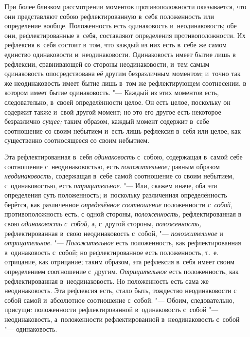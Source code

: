 При более близком рассмотрении моментов противоположности оказывается, что
они представляют собою рефлектированную в~себя положенность или определение
вообще. Положенность есть одинаковость и~неодинаковость; обе они,
рефлектированные в~себя, составляют определения противоположности. Их
рефлексия в~себя состоит в~том, что каждый из них есть в~себе же самом
единство одинаковости и~неодинаковости. Одинаковость имеет бытие лишь в
рефлексии, сравнивающей со стороны неодинаковости, и~тем самым одинаковость
опосредствована её другим безразличным моментом; и~точно так же
неодинаковость имеет бытие лишь в~том же рефлектирующем соотнесении, в
котором имеет бытие одинаковость. "--- Каждый из этих моментов есть,
следовательно, в~своей определённости целое. Он есть целое, поскольку он
содержит также и~свой другой момент; но это его другое есть некоторое
безразлично {\em сущее;} таким образом, каждый момент
содержит в~себе соотношение со своим небытием и~есть лишь рефлексия в~себя
или целое, как существенно соотносящееся со своим небытием.

Эта рефлектированная в~себя {\em одинаковость} с~собою,
содержащая в~самой себе соотношение с~неодинаковостью, есть
{\em положительное;} равным образом
{\em неодинаковость,} содержащая в~себе самой
соотношение со своим небытием, с~одинаковостью, есть
{\em отрицательное}. "--- Или, скажем иначе, оба эти
определения суть положенность; и~поскольку различенная определённость
берётся, как различенное {\em определённое соотношение}
положенности {\em с~собой,} противоположность есть, с
одной стороны, {\em положенность,} рефлектированная в
свою {\em одинаковость с~собой,} а, с~другой стороны,
{\em положенность,} рефлектированная в~свою
неодинаковость с~собой, "--- {\em положительное} и
{\em отрицательное}. "--- {\em Положительное} есть положенность, как
рефлектированная в~одинаковость с~собой; но рефлектированное есть
положенность, т.~е. отрицание, как отрицание; таким образом, эта рефлексия
в~себя имеет своим определением соотношение с~другим.
{\em Отрицательное} есть положенность, как
рефлектированная в~неодинаковость. Но положенность есть сама же
неодинаковость. Эта рефлексия есть, стало быть, тождество неодинаковости с
собой самой и~абсолютное соотношение с~собой. "--- Обоим, следовательно,
присущи: положенности рефлектированной в~одинаковость с~собой
"--- неодинаковость, а~положенности рефлектированной в~неодинаковость с~собой
"--- одинаковость.

